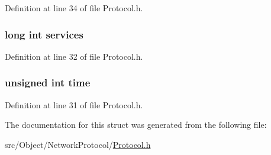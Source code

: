 Definition at line 34 of file Protocol.h.

\hypertarget{struct_net_addr_a7c2c2697560cb0d08fdca3bd4d10d07e}{
\subsubsection[{services}]{\setlength{\rightskip}{0pt plus 5cm}long int {\bf services}}}
\label{struct_net_addr_a7c2c2697560cb0d08fdca3bd4d10d07e}


Definition at line 32 of file Protocol.h.

\hypertarget{struct_net_addr_a83e57ce9bd59cfa0995c2e2c8589c274}{
\subsubsection[{time}]{\setlength{\rightskip}{0pt plus 5cm}unsigned int {\bf time}}}
\label{struct_net_addr_a83e57ce9bd59cfa0995c2e2c8589c274}


Definition at line 31 of file Protocol.h.



The documentation for this struct was generated from the following file:\begin{DoxyCompactItemize}
\item 
src/Object/NetworkProtocol/\hyperlink{_protocol_8h}{Protocol.h}\end{DoxyCompactItemize}
